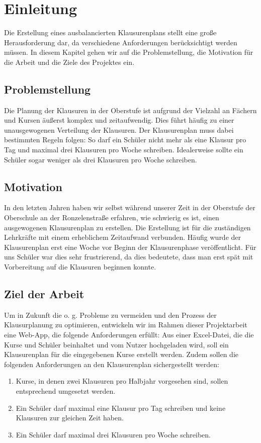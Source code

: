 \newpage
\section{Einleitung}
Die Erstellung eines ausbalancierten Klausurenplans stellt eine große Herausforderung dar, da verschiedene Anforderungen berücksichtigt werden müssen. In diesem Kapitel gehen wir auf die Problemstellung, die Motivation für die Arbeit und die Ziele des Projektes ein.

\subsection{Problemstellung}
Die Planung der Klausuren in der Oberstufe ist aufgrund der Vielzahl an Fächern und Kursen äußerst komplex und zeitaufwendig. Dies führt häufig zu einer unausgewogenen Verteilung der Klausuren. Der Klausurenplan muss dabei bestimmten Regeln folgen: So darf ein Schüler nicht mehr als eine Klausur pro Tag und maximal drei Klausuren pro Woche schreiben. Idealerweise sollte ein Schüler sogar weniger als drei Klausuren pro Woche schreiben.

\subsection{Motivation}
In den letzten Jahren haben wir selbst während unserer Zeit in der Oberstufe der Oberschule an der Ronzelenstraße erfahren, wie schwierig es ist, einen ausgewogenen Klausurenplan zu erstellen. Die Erstellung ist für die zuständigen Lehrkräfte mit einem erheblichem Zeitaufwand verbunden. Häufig wurde der Klausurenplan erst eine Woche vor Beginn der Klausurenphase veröffentlicht. Für uns Schüler war dies sehr frustrierend, da dies bedeutete, dass man erst spät mit Vorbereitung auf die Klausuren beginnen konnte.

\subsection{Ziel der Arbeit}
Um in Zukunft die o. g. Probleme zu vermeiden und den Prozess der Klausurplanung zu optimieren, entwickeln wir im Rahmen dieser Projektarbeit eine Web-App, die folgende Anforderungen erfüllt: Aus einer Excel-Datei, die die Kurse und Schüler beinhaltet und vom Nutzer hochgeladen wird, soll ein Klausurenplan für die eingegebenen Kurse erstellt werden. Zudem sollen die folgenden Anforderungen an den Klausurenplan sichergestellt werden:

\begin{enumerate}
    \item Kurse, in denen zwei Klausuren pro Halbjahr vorgesehen sind, sollen entsprechend umgesetzt werden.
    \item Ein Schüler darf maximal eine Klausur pro Tag schreiben und keine Klausuren zur gleichen Zeit haben.
    \item Ein Schüler darf maximal drei Klausuren pro Woche schreiben.
\end{enumerate}
